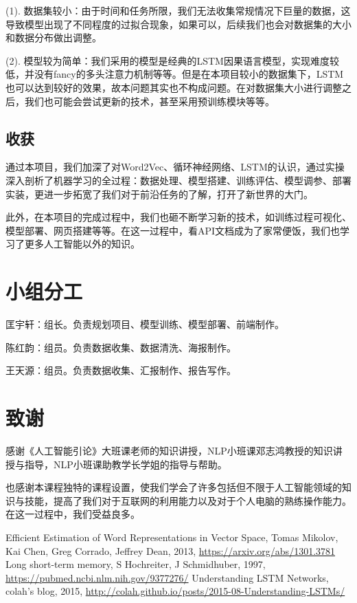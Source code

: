 \documentclass[12pt,a4paper]{article}
\begin{document}
(1). 数据集较小：由于时间和任务所限，我们无法收集常规情况下巨量的数据，这导致模型出现了不同程度的过拟合现象，如果可以，后续我们也会对数据集的大小和数据分布做出调整。

(2). 模型较为简单：我们采用的模型是经典的LSTM因果语言模型，实现难度较低，并没有fancy的多头注意力机制等等。但是在本项目较小的数据集下，LSTM也可以达到较好的效果，故本问题其实也不构成问题。在对数据集大小进行调整之后，我们也可能会尝试更新的技术，甚至采用预训练模块等等。

\subsection{收获}
通过本项目，我们加深了对Word2Vec、循环神经网络、LSTM的认识，通过实操深入剖析了机器学习的全过程：数据处理、模型搭建、训练评估、模型调参、部署实装，更进一步拓宽了我们对于前沿任务的了解，打开了新世界的大门。

此外，在本项目的完成过程中，我们也砸不断学习新的技术，如训练过程可视化、模型部署、网页搭建等等。在这一过程中，看API文档成为了家常便饭，我们也学习了更多人工智能以外的知识。


\section*{小组分工}

匡宇轩：组长。负责规划项目、模型训练、模型部署、前端制作。

陈红韵：组员。负责数据收集、数据清洗、海报制作。

王天源：组员。负责数据收集、汇报制作、报告写作。

\section*{致谢}

感谢《人工智能引论》大班课老师的知识讲授，NLP小班课邓志鸿教授的知识讲授与指导，NLP小班课助教学长学姐的指导与帮助。

也感谢本课程独特的课程设置，使我们学会了许多包括但不限于人工智能领域的知识与技能，提高了我们对于互联网的利用能力以及对于个人电脑的熟练操作能力。在这一过程中，我们受益良多。


\begin{thebibliography}{99} 
Efficient Estimation of Word Representations in Vector Space, Tomas Mikolov, Kai Chen, Greg Corrado, Jeffrey Dean, 2013, \href{https://arxiv.org/abs/1301.3781}{https://arxiv.org/abs/1301.3781}
Long short-term memory, S Hochreiter, J Schmidhuber, 1997, \href{https://pubmed.ncbi.nlm.nih.gov/9377276/}{https://pubmed.ncbi.nlm.nih.gov/9377276/}
Understanding LSTM Networks, colah's blog, 2015, \href{http://colah.github.io/posts/2015-08-Understanding-LSTMs/}{http://colah.github.io/posts/2015-08-Understanding-LSTMs/}
\end{thebibliography}
\end{document}
